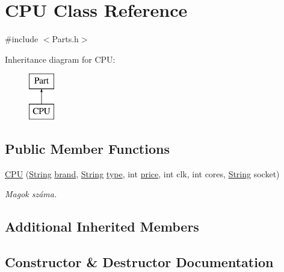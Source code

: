 \hypertarget{class_c_p_u}{}\section{C\+PU Class Reference}
\label{class_c_p_u}


{\ttfamily \#include $<$Parts.\+h$>$}

Inheritance diagram for C\+PU\+:\begin{figure}[H]
\begin{center}
\leavevmode
\includegraphics[height=2.000000cm]{class_c_p_u}
\end{center}
\end{figure}
\subsection*{Public Member Functions}
\begin{DoxyCompactItemize}
\item 
\mbox{\hyperlink{class_c_p_u_a44bd5ffce185e350b4865020028de97c}{C\+PU}} (\mbox{\hyperlink{class_string}{String}} \mbox{\hyperlink{class_part_ae06f2fdeb7fbbdb229a7aca151f3e341}{brand}}, \mbox{\hyperlink{class_string}{String}} \mbox{\hyperlink{class_part_a101dbcc5c4b21564df7414c7eb0eae88}{type}}, int \mbox{\hyperlink{class_part_a8e71223aed1da95a974f33d8d6c91bb1}{price}}, int clk, int cores, \mbox{\hyperlink{class_string}{String}} socket)
\begin{DoxyCompactList}\small\item\em Magok száma. \end{DoxyCompactList}\end{DoxyCompactItemize}
\subsection*{Additional Inherited Members}


\subsection{Constructor \& Destructor Documentation}
\mbox{\label{class_c_p_u_a44bd5ffce185e350b4865020028de97c}} 
